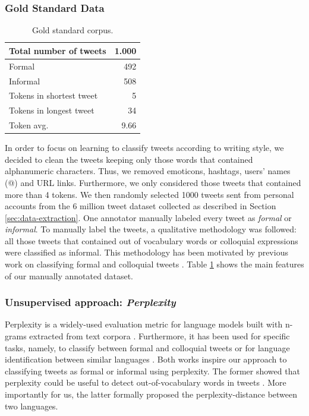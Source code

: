 \documentclass[information,article,submit,moreauthors,pdftex,10pt,a4paper]{Definitions/mdpi}
\begin{document}
\subsubsection{Gold Standard Data}\label{sec:gold-standard-data}

\begin{table}[H]
  \centering
  \begin{tabular}{|l|r|} \hline
    Total number of tweets & 1.000 \\ \hline
    Formal & 492 \\ \hline
    Informal & 508 \\ \hline
    Tokens in shortest tweet & 5 \\ \hline
    Tokens in longest tweet & 34 \\ \hline
    Token avg. & 9.66 \\ \hline
  \end{tabular}
  \caption{Gold standard corpus.}
  \label{tab:gold-corpus}
\end{table}


In order to focus on learning to classify tweets according to writing style, we decided to clean the tweets keeping only those words that contained alphanumeric characters. Thus, we removed emoticons, hashtags, users' names (@) and URL links. Furthermore, we only considered those tweets that contained more than 4 tokens. We then randomly selected 1000 tweets sent from personal accounts from the 6 million tweet dataset collected as described in Section \ref{sec:data-extraction}. One annotator manually labeled every tweet as \emph{formal} or \emph{informal}. To manually label the tweets, a qualitative methodology was followed: all those tweets that contained out of vocabulary words or colloquial expressions were classified as informal. This methodology has been motivated by previous work on classifying formal and colloquial tweets \cite{gonzalez2015analysis}. Table \ref{tab:gold-corpus} shows the main features of our manually annotated dataset.

\subsubsection{Unsupervised approach: \textit{Perplexity}}\label{sec:unsup-appr-text}

Perplexity is a widely-used evaluation metric for language models built with n-grams extracted from text corpora \cite{chen1999empirical}. Furthermore, it has been used for specific tasks, namely, to classify between formal and colloquial tweets \cite{gonzalez2015analysis} or for language identification between similar languages \cite{gamallo2017language}. Both works inspire our approach to classifying tweets as formal or informal using perplexity. The former showed that perplexity could be useful to detect out-of-vocabulary words in tweets \cite{gonzalez2015analysis}. More importantly for us, the latter formally proposed the perplexity-distance between two languages.
\end{document}
